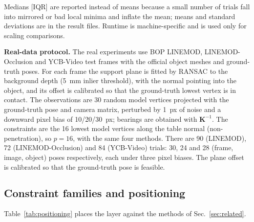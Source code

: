Medians [IQR] are reported instead of means because a small number of trials fall into mirrored or bad local minima and inflate the mean; means and standard deviations are in the result files. Runtime is machine-specific and is used only for scaling comparisons.

\textbf{Real-data protocol.} The real experiments use BOP LINEMOD, LINEMOD-Occlusion and YCB-Video test frames with the official object meshes and ground-truth poses. For each frame the support plane is fitted by RANSAC to the background depth (5~mm inlier threshold), with the normal pointing into the object, and its offset is calibrated so that the ground-truth lowest vertex is in contact. The observations are 30 random model vertices projected with the ground-truth pose and camera matrix, perturbed by 1~px of noise and a downward pixel bias of 10/20/30~px; bearings are obtained with $\mathbf K^{-1}$. The constraints are the 16 lowest model vertices along the table normal (non-penetration), so $p=16$, with the same four methods. There are 90 (LINEMOD), 72 (LINEMOD-Occlusion) and 84 (YCB-Video) trials: 30, 24 and 28 (frame, image, object) poses respectively, each under three pixel biases. The plane offset is calibrated so that the ground-truth pose is feasible.



\subsection{Constraint families and positioning}\label{app:families}
\begin{table}[t]
\centering
\caption{Constraint families, all affine in $(\mathbf v_2,\mathbf t)$, with $\mathbf m_a=\mathbf m_a(\mathbf p_i)$ for the point rows and $\mathbf m_a=\mathbf m_a(\mathbf v_j)$ for the vertex row. The tilt-cone row uses $\|\mathbf q\|^2=1$, i.e.\ it is $q_1^2+q_2^2\le\sin^2(\alpha/2)$ on the manifold.}
\label{tab:families}
\scriptsize
\setlength{\tabcolsep}{2pt}
\end{table}
Table~\ref{tab:positioning} places the layer against the methods of Sec.~\ref{sec:related}.

